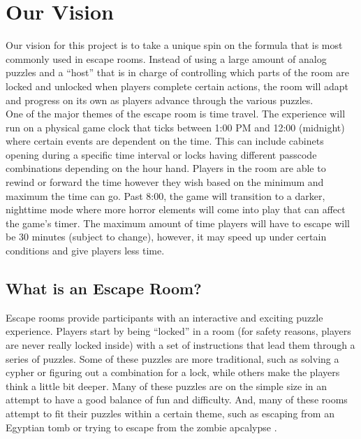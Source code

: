 \documentclass[conference]{IEEEtran}
\begin{document}
\section{Our Vision}
Our vision for this project is to take a unique spin on the formula that is most commonly used in escape rooms.
Instead of using a large amount of analog puzzles and a ``host'' that is in charge of controlling which parts of
the room are locked and unlocked when players complete certain actions, the room will adapt and progress on its
own as players advance through the various puzzles.
\\
\indent One of the major themes of the escape room is time travel. The experience will run
on a physical game clock that ticks between 1:00 PM and 12:00 (midnight) where certain events are
dependent on the time. This can include cabinets opening during a specific time interval or
locks having different passcode combinations depending on the hour hand. Players in the
room are able to rewind or forward the time however they wish based on the minimum and
maximum the time can go. Past 8:00, the game will transition to a darker, nighttime mode where
more horror elements will come into play that can affect the game's timer. The maximum amount 
of time players will have to escape will be 30 minutes (subject to change), however, it may speed up under
certain conditions and give players less time.

\subsection*{What is an Escape Room?}
Escape rooms provide participants with an interactive and exciting puzzle experience. 
Players start by being ``locked'' in a room (for safety reasons, players are never really
locked inside) with a set of instructions that lead them through a series of puzzles. Some of
these puzzles are more traditional, such as solving a cypher or figuring out a combination for a lock,
while others make the players think a little bit deeper. Many of these puzzles are on the simple size in
an attempt to have a good balance of fun and difficulty. And, many of these rooms attempt to fit their
puzzles within a certain theme, such as escaping from an Egyptian tomb or trying to escape from the zombie
apcalypse \cite{wikipediaEscapeRoom}.
\end{document}
